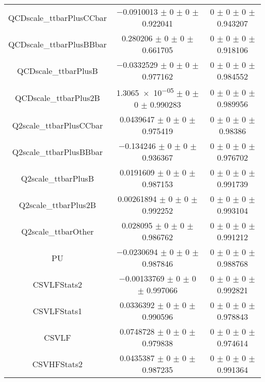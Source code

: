 \begin{table}
\begin{tabular}{ccc}
QCDscale\_ttbarPlusCCbar 	& \num{-0.0910013} $\pm$ \num{0} $\pm$ \num{0} $\pm$ \num{0.922041} 	& \num{0} $\pm$ \num{0} $\pm$ \num{0} $\pm$ \num{0.943207}\\
QCDscale\_ttbarPlusBBbar 	& \num{0.280206} $\pm$ \num{0} $\pm$ \num{0} $\pm$ \num{0.661705} 	& \num{0} $\pm$ \num{0} $\pm$ \num{0} $\pm$ \num{0.918106}\\
QCDscale\_ttbarPlusB 	& \num{-0.0332529} $\pm$ \num{0} $\pm$ \num{0} $\pm$ \num{0.977162} 	& \num{0} $\pm$ \num{0} $\pm$ \num{0} $\pm$ \num{0.984552}\\
QCDscale\_ttbarPlus2B 	& \num{1.3065e-05} $\pm$ \num{0} $\pm$ \num{0} $\pm$ \num{0.990283} 	& \num{0} $\pm$ \num{0} $\pm$ \num{0} $\pm$ \num{0.989956}\\
Q2scale\_ttbarPlusCCbar 	& \num{0.0439647} $\pm$ \num{0} $\pm$ \num{0} $\pm$ \num{0.975419} 	& \num{0} $\pm$ \num{0} $\pm$ \num{0} $\pm$ \num{0.98386}\\
Q2scale\_ttbarPlusBBbar 	& \num{-0.134246} $\pm$ \num{0} $\pm$ \num{0} $\pm$ \num{0.936367} 	& \num{0} $\pm$ \num{0} $\pm$ \num{0} $\pm$ \num{0.976702}\\
Q2scale\_ttbarPlusB 	& \num{0.0191609} $\pm$ \num{0} $\pm$ \num{0} $\pm$ \num{0.987153} 	& \num{0} $\pm$ \num{0} $\pm$ \num{0} $\pm$ \num{0.991739}\\
Q2scale\_ttbarPlus2B 	& \num{0.00261894} $\pm$ \num{0} $\pm$ \num{0} $\pm$ \num{0.992252} 	& \num{0} $\pm$ \num{0} $\pm$ \num{0} $\pm$ \num{0.993104}\\
Q2scale\_ttbarOther 	& \num{0.028095} $\pm$ \num{0} $\pm$ \num{0} $\pm$ \num{0.986762} 	& \num{0} $\pm$ \num{0} $\pm$ \num{0} $\pm$ \num{0.991212}\\
PU 	& \num{-0.0230694} $\pm$ \num{0} $\pm$ \num{0} $\pm$ \num{0.987846} 	& \num{0} $\pm$ \num{0} $\pm$ \num{0} $\pm$ \num{0.988768}\\
CSVLFStats2 	& \num{-0.00133769} $\pm$ \num{0} $\pm$ \num{0} $\pm$ \num{0.997066} 	& \num{0} $\pm$ \num{0} $\pm$ \num{0} $\pm$ \num{0.992821}\\
CSVLFStats1 	& \num{0.0336392} $\pm$ \num{0} $\pm$ \num{0} $\pm$ \num{0.990596} 	& \num{0} $\pm$ \num{0} $\pm$ \num{0} $\pm$ \num{0.978843}\\
CSVLF 	& \num{0.0748728} $\pm$ \num{0} $\pm$ \num{0} $\pm$ \num{0.979838} 	& \num{0} $\pm$ \num{0} $\pm$ \num{0} $\pm$ \num{0.974614}\\
CSVHFStats2 	& \num{0.0435387} $\pm$ \num{0} $\pm$ \num{0} $\pm$ \num{0.987235} 	& \num{0} $\pm$ \num{0} $\pm$ \num{0} $\pm$ \num{0.991364}\\

\end{tabular}
\end{table}
